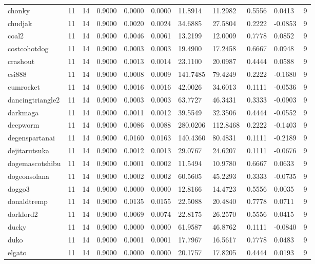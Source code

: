 \begin{table}[htbp]
\begin{tabular}{lllllllllll}
chonky & 11 & 14 & 0.9000 & 0.0000 & 0.0000 & 11.8914 & 11.2982 & 0.5556 & 0.0413 & 9 \\
chudjak & 11 & 14 & 0.9000 & 0.0020 & 0.0024 & 34.6885 & 27.5804 & 0.2222 & -0.0853 & 9 \\
coal2 & 11 & 14 & 0.9000 & 0.0046 & 0.0061 & 13.2199 & 12.0009 & 0.7778 & 0.0852 & 9 \\
costcohotdog & 11 & 14 & 0.9000 & 0.0003 & 0.0003 & 19.4900 & 17.2458 & 0.6667 & 0.0948 & 9 \\
crashout & 11 & 14 & 0.9000 & 0.0013 & 0.0014 & 23.1100 & 20.0987 & 0.4444 & 0.0588 & 9 \\
csi888 & 11 & 14 & 0.9000 & 0.0008 & 0.0009 & 141.7485 & 79.4249 & 0.2222 & -0.1680 & 9 \\
cumrocket & 11 & 14 & 0.9000 & 0.0016 & 0.0016 & 42.0026 & 34.6013 & 0.1111 & -0.0536 & 9 \\
dancingtriangle2 & 11 & 14 & 0.9000 & 0.0003 & 0.0003 & 63.7727 & 46.3431 & 0.3333 & -0.0903 & 9 \\
darkmaga & 11 & 14 & 0.9000 & 0.0011 & 0.0012 & 39.5549 & 32.3506 & 0.4444 & -0.0552 & 9 \\
deepworm & 11 & 14 & 0.9000 & 0.0086 & 0.0088 & 280.0206 & 112.8468 & 0.2222 & -0.1403 & 9 \\
degenspartanai & 11 & 14 & 0.9000 & 0.0160 & 0.0163 & 140.4360 & 80.4831 & 0.1111 & -0.2189 & 9 \\
dejitarutsuka & 11 & 14 & 0.9000 & 0.0012 & 0.0013 & 29.0767 & 24.6207 & 0.1111 & -0.0676 & 9 \\
dogemascotshibu & 11 & 14 & 0.9000 & 0.0001 & 0.0002 & 11.5494 & 10.9780 & 0.6667 & 0.0633 & 9 \\
dogeonsolana & 11 & 14 & 0.9000 & 0.0002 & 0.0002 & 60.5605 & 45.2293 & 0.3333 & -0.0735 & 9 \\
doggo3 & 11 & 14 & 0.9000 & 0.0000 & 0.0000 & 12.8166 & 14.4723 & 0.5556 & 0.0035 & 9 \\
donaldtremp & 11 & 14 & 0.9000 & 0.0135 & 0.0155 & 22.5088 & 20.4840 & 0.7778 & 0.0711 & 9 \\
dorklord2 & 11 & 14 & 0.9000 & 0.0069 & 0.0074 & 22.8175 & 26.2570 & 0.5556 & 0.0415 & 9 \\
ducky & 11 & 14 & 0.9000 & 0.0000 & 0.0000 & 61.9587 & 46.8762 & 0.1111 & -0.0840 & 9 \\
duko & 11 & 14 & 0.9000 & 0.0001 & 0.0001 & 17.7967 & 16.5617 & 0.7778 & 0.0483 & 9 \\
elgato & 11 & 14 & 0.9000 & 0.0000 & 0.0000 & 20.1757 & 17.8205 & 0.4444 & 0.0193 & 9 \\

\end{tabular}
\end{table}
